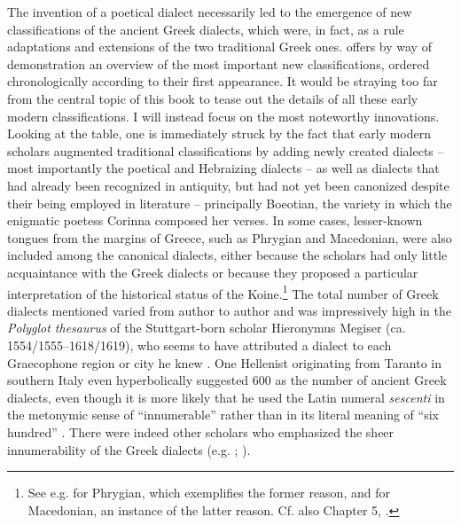 The invention of a poetical dialect necessarily led to the emergence of new classifications of the ancient Greek dialects, which were, in fact, as a rule adaptations and extensions of the two traditional Greek ones.  offers by way of demonstration an overview of the most important new classifications, ordered chronologically according to their first appearance. It would be straying too far from the central topic of this book to tease out the details of all these early modern classifications. I will instead focus on the most noteworthy innovations. Looking at the table, one is immediately struck by the fact that early modern scholars augmented traditional classifications by adding newly created dialects – most importantly the poetical and Hebraizing dialects – as well as dialects that had already been recognized in antiquity, but had not yet been canonized despite their being employed in literature – principally Boeotian, the variety in which the enigmatic poetess Corinna composed her verses. In some cases, lesser-known tongues from the margins of Greece, such as Phrygian and Macedonian, were also included among the canonical dialects, either because the scholars had only little acquaintance with the Greek dialects or because they proposed a particular interpretation of the historical status of the Koine.\footnote{See e.g. \citet[131]{Kircher1679} for Phrygian, which exemplifies the former reason, and \citet[\textsc{c.2}\textsc{\textsuperscript{v}}]{Schwartz1702} for Macedonian, an instance of the latter reason. Cf. also Chapter 5, .} The total number of Greek dialects mentioned varied from author to author and was impressively high in the \textit{Polyglot thesaurus} of the Stuttgart-born scholar Hieronymus Megiser (ca. 1554/1555–1618/1619), who seems to have attributed a dialect to each Graecophone region or city he knew \citep[.7\textsc{\textsuperscript{r-v}}]{Megiser1603}. One Hellenist originating from Taranto in southern Italy even hyperbolically suggested 600 as the number of ancient Greek dialects, even though it is more likely that he used the Latin numeral \textit{sescenti} in the metonymic sense of “innumerable” rather than in its literal meaning of “six hundred” \citep[9]{Giovane1589}. There were indeed other scholars who emphasized the sheer innumerability of the Greek dialects (e.g. \citealt[127]{Bischoff1708}; \citealt[196]{Ries1786}).

